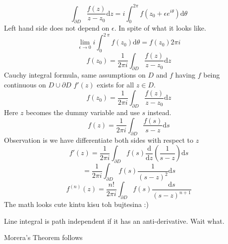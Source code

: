 \documentclass[letter]{article}
\begin{document}
\[
	\int_{\partial D} \frac{f(z)}{z-z_0} \mathrm{d} z = 
i	\int_0^{2\pi }  f(z_0 + \epsilon e^{i \theta} )\mathrm{d} \theta
\] Left hand side does not depend on $\epsilon$. In spite of what it looks like. 
\[
\lim_{\epsilon \to 0} i \int_0^{2\ \pi } f (z_0) \mathrm{d} \theta = f(z_0) 2\pi i
\] 
\[
\boxed{
	f(z_0) = \frac{1}{2 \pi i} \int_{\partial D} \frac{f(z)}{z-z_0} \mathrm{d} z
}
\] 
Cauchy integral formula, same assumptions on $D$ and $f$ having $f$ being continuous on $D \cup \partial D$ $f'(z) $ exists for all $z \in D$.
\[
	f(z_0) = \frac{1}{2 \pi i} \int_{\partial D} \frac{f(z)}{z-z_0} \mathrm{d} z
\]
Here $z$ becomes the dummy variable and use $s$ instead. 
\[
	f(z) = \frac{1}{2 \pi i} \int_{\partial D} \frac{f(s)}{s-z} \mathrm{d} s
\]
Observation is we have differentiate both sides with respect to $z$ 
\[
	f'(z) = \frac{1}{2\pi i} \int_{\partial D} f(s) 
	\frac{\mathrm{d} }{\mathrm{d} z} \left(\frac{1}{s-z}\right)\mathrm{d} s
\]
\[
	= \frac{1}{2 \pi i} \int_{\partial D} f(s) \frac{1}{(s-z)^2}\mathrm{d} s
\]
\[
	f^{(n)}(z) = \frac{n!}{2 \pi i} \int_{\partial D} f(s) \frac{\mathrm{d} s}{(s-z)^{n+1}}
\]
The math looks cute kintu kisu toh bujtesina :)

Line integral is path independent if it has an anti-derivative. Wait what. 

Morera's Theorem follows


\end{document}

